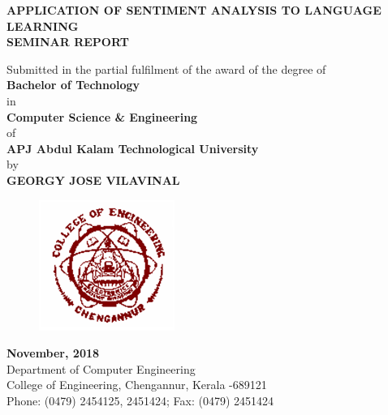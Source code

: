 \documentclass[a4paper,12pt,oneside]{article}
\begin{document}
\thispagestyle{empty}
\begin{center}

\large{\textbf{{APPLICATION OF SENTIMENT ANALYSIS TO LANGUAGE LEARNING}}}
\setlength{\baselineskip}{1.5\baselineskip}
\\

\vspace{5mm}
\textbf{SEMINAR REPORT}

Submitted in the partial fulfilment of the award of the degree
of
\\
\textbf{Bachelor of Technology}
\\
in
\\
\textbf{Computer Science \& Engineering}
\\
of
\\
\textbf{APJ Abdul Kalam Technological University}
\\
by
\\
\textbf{GEORGY JOSE VILAVINAL}
\\
\vspace{5mm}
\begin{figure}[H]
	\centering
	\includegraphics{ceclogo.png}
\end{figure}
\textbf{November, 2018}
\vspace{8mm}
\\
Department of Computer Engineering
\\
College of Engineering, Chengannur, Kerala -689121
\\
Phone: (0479) 2454125, 2451424; Fax: (0479) 2451424
\\



\end{center}
\newpage
\thispagestyle{empty}
\end{document}
